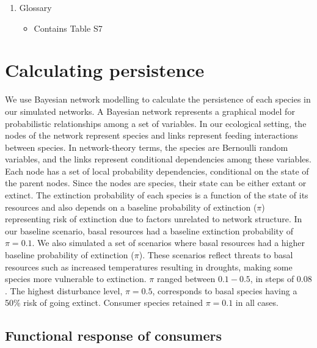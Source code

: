\documentclass[12pt]{article}
\begin{document}
\begin{spacing}{2.0}
\begin{spacing}{1.0}
\begin{enumerate}
        \item Glossary    

            \begin{itemize}
                \item Contains Table S7
            \end{itemize}


    \end{enumerate}    
\end{spacing}
\clearpage

\linenumbers
\section{Calculating persistence}        

        We use Bayesian network modelling to calculate the persistence of each species in our simulated networks. 
        A Bayesian network represents a graphical model for probabilistic relationships among a set of variables. 
        In our ecological setting, the nodes of the network represent species and links represent feeding interactions between species.
        In network-theory terms, the species are Bernoulli random variables, and the links represent conditional dependencies among these variables. 
        Each node has a set of local probability dependencies, conditional on the state of the parent nodes. 
        Since the nodes are species, their state can be either extant or extinct.
        The extinction probability of each species is a function of the state of its resources and also depends on a baseline probability of extinction ($\pi$) representing risk of extinction due to factors unrelated to network structure.
        In our baseline scenario, basal resources had a baseline extinction probability of $\pi = 0.1$. 
        We also simulated a set of scenarios where basal resources had a higher baseline probability of extinction ($\pi$). 
        These scenarios reflect threats to basal resources such as increased temperatures resulting in droughts, making some species more vulnerable to extinction.
        $\pi$ ranged between $0.1-0.5$, in steps of $0.08$. 
        The highest disturbance level, $\pi = 0.5$, corresponds to basal species having a 50\% risk of going extinct. 
        Consumer species retained $\pi=0.1$ in all cases.


    \subsection{Functional response of consumers}


\end{spacing}
\end{document}
